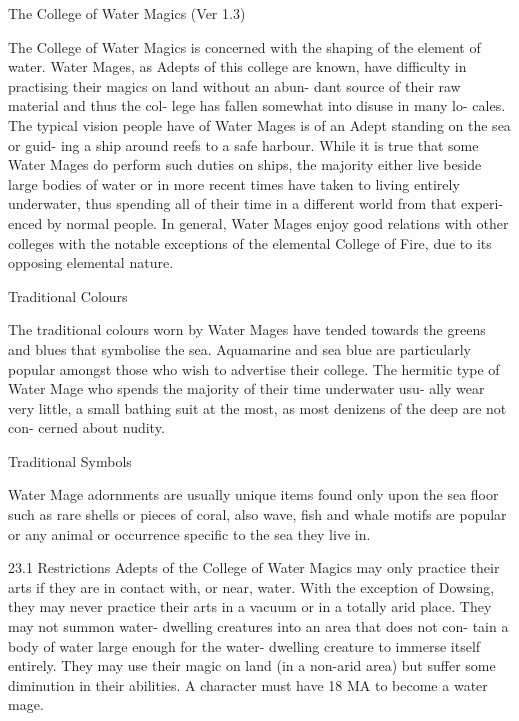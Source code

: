 \begin{Chapter}{The College of Water Magics (Ver 1.3)}

The College of Water Magics is concerned with the 
shaping  of  the  element  of  water.  Water  Mages,  as 
Adepts of this college are known, have difficulty in 
practising  their  magics  on  land  without  an  abun-
dant source of their raw material and thus the col-
lege  has  fallen  somewhat  into  disuse  in  many  lo-
cales.  The  typical  vision  people  have  of  Water 
Mages is of an Adept standing on the sea or guid-
ing a ship around reefs to a safe harbour. While it 
is  true  that  some  Water  Mages  do  perform  such 
duties on ships, the majority either live beside large 
bodies of water or in more recent times have taken 
to  living  entirely  underwater,  thus  spending  all  of 
their  time  in  a  different  world  from  that  experi-
enced  by  normal  people.  In  general,  Water  Mages 
enjoy  good  relations  with  other  colleges  with  the 
notable  exceptions  of  the  elemental  College  of 
Fire, due to its opposing elemental nature. 

Traditional Colours 

The traditional colours worn by Water Mages have 
tended towards the greens and blues that symbolise 
the  sea.  Aquamarine  and  sea  blue  are  particularly 
popular amongst those who wish to advertise their 
college.  The  hermitic  type  of  Water  Mage  who 
spends  the  majority  of  their  time  underwater  usu-
ally  wear  very  little,  a  small  bathing  suit  at  the 
most,  as  most  denizens  of  the  deep  are  not  con-
cerned about nudity. 

Traditional Symbols 

Water  Mage  adornments  are  usually  unique  items 
found only upon the sea floor such as rare shells or 
pieces  of  coral,  also  wave,  fish  and  whale  motifs 
are popular or any animal or occurrence specific to 
the sea they live in. 

23.1 Restrictions 
Adepts  of  the  College  of  Water  Magics  may  only 
practice  their  arts  if  they  are  in  contact  with,  or 
near,  water.  With  the  exception  of  Dowsing,  they 
may  never  practice  their  arts  in  a  vacuum  or  in  a 
totally  arid  place.  They  may  not  summon  water-
dwelling  creatures  into  an  area  that  does  not  con-
tain  a  body  of  water  large  enough  for  the  water-
dwelling  creature  to  immerse  itself  entirely.  They 
may  use  their  magic  on  land  (in  a  non-arid  area) 
but  suffer  some  diminution  in  their  abilities.  A 
character  must  have  18  MA  to  become  a  water 
mage. 


\end{Chapter}
